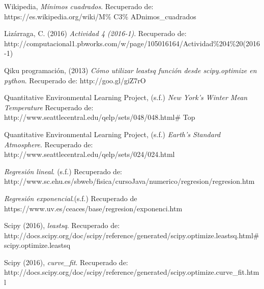 \documentclass[12pt]{article}
\begin{document}
\begin{thebibliography}{9}
	
	Wikipedia,
	\emph{Mínimos cuadrados}. Recuperado de: https://es.wikipedia.org/wiki/M\% C3\% ADnimos\_cuadrados
	
	Lizárraga, C. (2016)
	\textit{Actividad 4 (2016-1)}. Recuperado de: http://computacional1.pbworks.com/w/page/105016164/Actividad\%204\%20(2016-1)
	

	Qiku programación, (2013)
	\emph{Cómo utilizar leastsq función desde scipy.optimize en python}. Recuperado de: http://goo.gl/giZ7rO


	Quantitative Environmental Learning Project, (s.f.)	\emph{New York's Winter Mean Temperature} Recuperado de: http://www.seattlecentral.edu/qelp/sets/048/048.html\# Top
	
	
	Quantitative Environmental Learning Project, (s.f.)	\emph{Earth's Standard Atmosphere}. Recuperado de: http://www.seattlecentral.edu/qelp/sets/024/024.html
	
	\emph{Regresión lineal}. (s.f.) Recuperado de: http://www.sc.ehu.es/sbweb/fisica/cursoJava/numerico/regresion/regresion.htm

	\emph{Regresión exponencial}.(s.f.) Recuperado de https://www.uv.es/ceaces/base/regresion/exponenci.htm
	
	Scipy (2016), 
	\emph{leastsq}. Recuperado de:\\ http://docs.scipy.org/doc/scipy/reference/generated/scipy.optimize.leastsq.html\# scipy.optimize.leastsq

	Scipy (2016),
	\emph{curve\_fit}. Recuperado de:\\ http://docs.scipy.org/doc/scipy/reference/generated/scipy.optimize.curve\_fit.html
\end{thebibliography}
\end{document}
